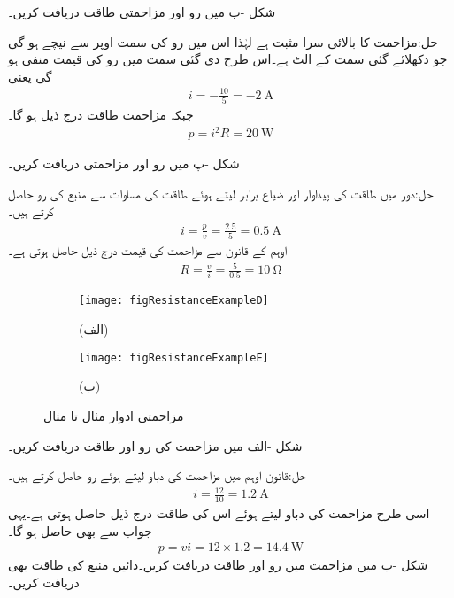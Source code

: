 شکل -ب میں رو اور مزاحمتی طاقت دریافت کریں۔

حل:مزاحمت کا بالائی سرا مثبت ہے لہٰذا اس میں رو کی سمت اوپر سے نیچے ہو گی جو دکھلائے گئی سمت کے الٹ ہے۔اس طرح دی گئی سمت میں رو کی قیمت منفی ہو گی یعنی
\begin{align*}
i=-\frac{10}{5}=\SI{-2}{\ampere}
\end{align*}
جبکہ مزاحمت طاقت درج ذیل ہو گا۔
\begin{align*}
p=i^2 R=\SI{20}{\watt}
\end{align*}

شکل -پ میں رو اور مزاحمتی دریافت کریں۔

حل:دور میں طاقت کی پیداوار اور ضیاع برابر لیتے ہوئے طاقت کی مساوات  سے منبع کی رو حاصل کرتے ہیں۔
\begin{align*}
i=\frac{p}{v}=\frac{2.5}{5}=\SI{0.5}{\ampere}
\end{align*}
اوہم کے قانون سے مزاحمت کی قیمت درج ذیل حاصل ہوتی ہے۔
\begin{align*}
R=\frac{v}{i}=\frac{5}{0.5}=\SI{10}{\ohm}
\end{align*} 

\begin{figure}
\centering
\begin{subfigure}{0.5\textwidth}
\texttt{[image: figResistanceExampleD]}
\caption*{(الف)}
\end{subfigure}%
%
\begin{subfigure}{0.5\textwidth}
\texttt{[image: figResistanceExampleE]}
\caption*{(ب)}
\end{subfigure}%
\caption{مزاحمتی ادوار مثال  تا مثال }
\label{شکل_مزاحمتی_اکلوتا_مزاحمت_کئی_منبع_کی_طاقت}
\end{figure}

شکل -الف میں مزاحمت کی رو اور طاقت دریافت کریں۔

حل:قانون اوہم میں مزاحمت کی دباو  لیتے ہوئے رو حاصل کرتے ہیں۔
\begin{align*}
i=\frac{12}{10}=\SI{1.2}{\ampere}
\end{align*}
اسی طرح مزاحمت کی دباو  لیتے ہوئے اس کی طاقت درج ذیل حاصل ہوتی ہے۔یہی جواب  سے بھی حاصل ہو گا۔
\begin{align*}
p=v i =12 \times 1.2=\SI{14.4}{\watt}
\end{align*}
شکل -ب میں مزاحمت میں رو اور طاقت دریافت کریں۔دائیں منبع کی طاقت بھی دریافت کریں۔

